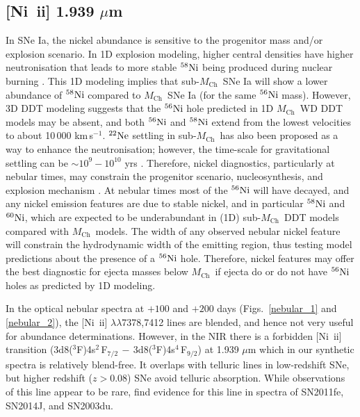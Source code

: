 \documentclass[useAMS,usenatbib,useasmath]{mnras}
\newcommand{\Mch}{\hbox{$M_{\text{Ch}}$}}
\newcommand{\kms}{\hbox{km$\,$s$^{-1}$}}
\newcommand{\elem}[2][default]{$^{#1}{\rm #2}$}
\newcommand{\nkii}{\mbox{Ni~{\sc ii}}}
\newcommand{\lb}{$\lambda$}
\def\figs{Figs.}
\begin{document}
\subsection{[\nkii] 1.939 $\mu$m}\label{nickel_line_diag}%
In SNe Ia, the nickel abundance is sensitive to the progenitor mass and/or explosion scenario. In 1D explosion modeling, higher central densities have higher neutronisation that leads to more stable \elem[58]{Ni} being produced during nuclear burning \citep{Nomoto1984,Khokhlov1991a,Khokhlov1991b}. This 1D modeling implies that sub-\Mch\ SNe Ia will show a lower abundance of \elem[58]{Ni} compared to \Mch\ SNe Ia (for the same \elem[56]{Ni} mass). However, 3D DDT modeling suggests that the \elem[56]{Ni} hole predicted in 1D \Mch\ WD DDT models may be absent, and both \elem[56]{Ni} and \elem[58]{Ni} extend from the lowest velocities to about 10\,000 \kms \citep{Kasen2009,Seitenzahl2013}. \elem[22]{Ne} settling in sub-\Mch\ has also been proposed as a way to enhance the neutronisation; however, the time-scale for gravitational settling can be $\sim10^9-10^{10}$ yrs \citep{Bildsten2001}. Therefore, nickel diagnostics, particularly at nebular times, may constrain the progenitor scenario, nucleosynthesis, and explosion mechanism \citep{Woosley1997,Iwamoto1999,Stehle2005,Mazzali2006,Gerardy2007,Maeda2010,Mazzali2011,Mazzali2012,Mazzali2015}. At nebular times most of the \elem[56]{Ni} will have decayed, and any nickel emission features are due to stable nickel, and in particular \elem[58]{Ni} and \elem[60]{Ni}, which are expected to be underabundant in (1D) sub-\Mch\ DDT models compared with \Mch\ models. The width of any observed nebular nickel feature will constrain the hydrodynamic width of the emitting region, thus testing model predictions about the presence of a \elem[56]{Ni} hole. Therefore, nickel features may offer the best diagnostic for ejecta masses below \Mch\ if ejecta do or do not have \elem[56]{Ni} holes as predicted by 1D modeling. 

In the optical nebular spectra at $+100$ and $+200$ days (\figs~\ref{nebular_1} and \ref{nebular_2}), the [\nkii] \lb\lb7378,7412 lines are blended, and hence not very useful for abundance determinations. However, in the NIR there is a  forbidden [\nkii] transition (3d8($^3$F)4s${}^2$\,F$_{7/2}\,-\,$3d8($^3$F)4s$^4$\,F$_{9/2}$) at 1.939 $\mu$m which in our synthetic spectra is relatively blend-free. It overlaps with telluric lines in low-redshift SNe, but higher redshift ($z>0.08$) SNe avoid telluric absorption. While observations of this line appear to be rare, \cite{Friesen2014} find evidence for this line in spectra of SN2011fe, SN2014J, and SN2003du.
\end{document}

